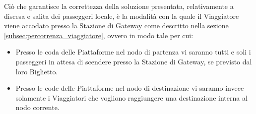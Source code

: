	Ciò che garantisce la correttezza della soluzione presentata, relativamente a discesa e salita dei passeggeri locale, è la modalità con la quale il Viaggiatore viene accodato presso la Stazione di Gateway come descritto nella sezione \ref{subsec:percorrenza_viaggiatore}, ovvero in modo tale per cui:
	\begin{itemize}
		\item Presso le coda  delle Piattaforme nel nodo di partenza vi saranno tutti e soli i passeggeri in attesa di scendere presso la Stazione di Gateway, se previsto dal loro Biglietto.
		\item Presso le code  delle Piattaforme nel nodo di destinazione vi saranno invece solamente i Viaggiatori che vogliono raggiungere una destinazione interna al nodo corrente.
	\end{itemize}  
	 
	
